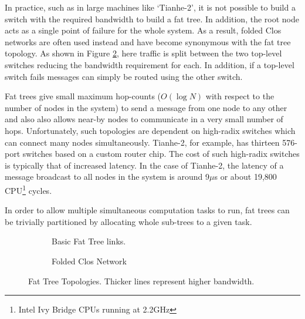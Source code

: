 				In practice, such as in large machines like `Tianhe-2', it is not
				possible to build a switch with the required bandwidth to build a fat
				tree. In addition, the root node acts as a single point of failure for
				the whole system. As a result, folded Clos networks are often used
				instead and have become synonymous with the fat tree topology. As shown
				in Figure \ref{fig:fat-tree-closs}, here traffic is split between the
				two top-level switches reducing the bandwidth requirement for each. In
				addition, if a top-level switch fails messages can simply be routed
				using the other switch.
				
				Fat trees give small maximum hop-counts ($O(\log{N})$ with respect to
				the number of nodes in the system) to send a message from one node to
				any other and also also allows near-by nodes to communicate in a very
				small number of hops. Unfortunately, such topologies are dependent on
				high-radix switches which can connect many nodes simultaneously.
				Tianhe-2, for example, has thirteen 576-port switches based on a custom
				router chip. The cost of such high-radix switches is typically that of
				increased latency. In the case of Tianhe-2, the latency of a message
				broadcast to all nodes in the system is around 9$\mu$s or about 19,800
				CPU\footnote{Intel Ivy Bridge CPUs running at 2.2GHz}
				cycles\cite{dongarra13}.
				
				In order to allow multiple simultaneous computation tasks to run, fat
				trees can be trivially partitioned by allocating whole sub-trees to a
				given task.
				
				\begin{figure}
					\begin{subfigure}[t]{\textwidth}
						\center
						
						\caption{Basic Fat Tree
						links.}
						\label{fig:fat-tree-concept}
					\end{subfigure}
					
					\vspace{1em}
					
					\begin{subfigure}[t]{\textwidth}
						\center
						
						\caption{Folded Clos Network}
						\label{fig:fat-tree-closs}
					\end{subfigure}
					
					\caption[Fat Tree Topologies]{Fat Tree Topologies. Thicker lines
					represent higher bandwidth.}
					\label{fig:fat-tree}
				\end{figure}
			
